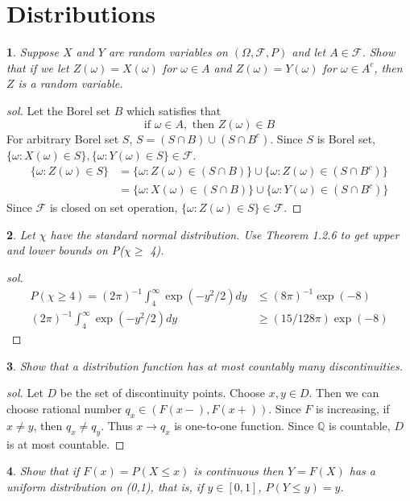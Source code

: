 \documentclass{report}
\newtheorem{ex}{}[section]
\begin{document}
\section{Distributions}
\begin{ex}
Suppose $X$ and $Y$ are random variables on $(\Omega,\mathcal{F}, P)$ and let $A \in \mathcal{F}$. Show that if we let $Z(\omega) = X(\omega)$ for $\omega \in A$ and $Z(\omega) = Y (\omega)$ for $\omega \in A^c$, then $Z$ is a random variable.
\end{ex}
\begin{proof}[sol]
Let the Borel set $B$ which satisfies that
\[\text{if } \omega \in A, \text{ then } Z(\omega) \in B\]
For arbitrary Borel set $S$, $S = (S\cap B)\cup (S\cap B^c)$. Since $S$ is Borel set, $\{\omega : X(\omega) \in S\}, \{\omega : Y(\omega) \in S\} \in \mathcal{F}$.
\begin{align*}
    \{\omega : Z(\omega) \in S\} &= \{\omega : Z(\omega) \in (S\cap B)\} \cup \{\omega : Z(\omega) \in (S\cap B^c)\}\\
    &= \{\omega : X(\omega) \in (S\cap B)\} \cup \{\omega : Y(\omega) \in (S\cap B^c)\}
\end{align*}
Since $\mathcal{F}$ is closed on set operation, $\{\omega : Z(\omega) \in S\} \in \mathcal{F}$. 
\end{proof}
\begin{ex}
Let $\chi$ have the standard normal distribution. Use Theorem 1.2.6 to get upper and lower bounds on P($\chi \ge $ 4).
\end{ex}
\begin{proof}[sol]
\begin{align*}
    P(\chi \ge 4) = (2\pi)^{-1}\int_4^\infty \exp(-y^2/2)dy &\le (8\pi)^{-1}\exp(-8)\\
    (2\pi)^{-1}\int_4^\infty \exp(-y^2/2)dy &\ge (15/128\pi)\exp(-8)
\end{align*}
\end{proof}
\begin{ex}
Show that a distribution function has at most countably many discontinuities.
\end{ex}
\begin{proof}[sol]
Let $D$ be the set of discontinuity points. Choose $x, y \in D$. Then we can choose rational number $q_x \in (F(x-), F(x+))$. Since $F$ is increasing, if $x\ne y$, then $q_x \ne q_y$. Thus $x \to q_x$ is one-to-one function. Since $\mathbb{Q}$ is countable, $D$ is at most countable.
\end{proof}
\begin{ex}
Show that if $F(x) = P(X \le x)$ is continuous then $Y = F(X)$ has a uniform distribution on (0,1), that is, if $y \in [0, 1]$, $P(Y \le y) = y$.
\end{ex}
\end{document}
